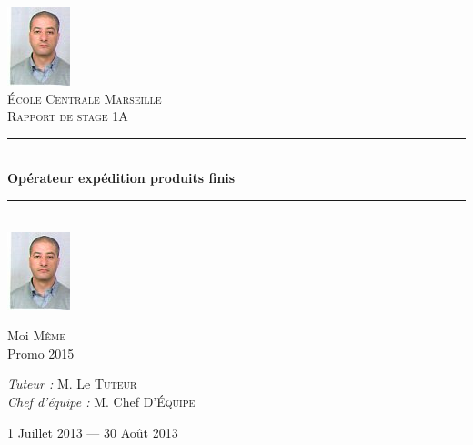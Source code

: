 \documentclass[12pt, openany]{report}
\newcommand{\HRule}{\rule{\linewidth}{0.5mm}}
\begin{document}
\begin{titlepage}
  \begin{sffamily}
  \begin{center}

    \includegraphics[scale=0.04]{../img/redha.jpg}~\\[1.5cm]

    \textsc{\LARGE École Centrale Marseille}\\[2cm]

    \textsc{\Large Rapport de stage 1A}\\[1.5cm]

    \HRule \\[0.4cm]
    { \huge \bfseries Opérateur expédition produits finis\\[0.4cm] }

    \HRule \\[2cm]
    \includegraphics[scale=0.2]{../img/redha.jpg}
    \\[2cm]

    \begin{minipage}{0.4\textwidth}
      \begin{flushleft} \large
        Moi \textsc{Même}\\
        Promo 2015\\
      \end{flushleft}
    \end{minipage}
    \begin{minipage}{0.4\textwidth}
      \begin{flushright} \large
        \emph{Tuteur :} M. Le \textsc{Tuteur}\\
        \emph{Chef d'équipe : } M. Chef \textsc{D’Équipe}
      \end{flushright}
    \end{minipage}

    \vfill

    {\large 1\ier{} Juillet 2013 — 30 Août 2013}

  \end{center}
  \end{sffamily}
\end{titlepage}
\end{document}
